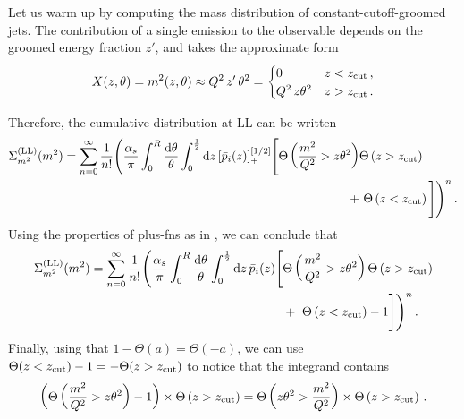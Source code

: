 \begin{example}
    \label{ex:constant-cutoff-mass}
    Let us warm up by computing the mass distribution of constant-cutoff-groomed jets.
    The contribution of a single emission to the observable depends on the groomed energy fraction \(z'\), and takes the approximate form
    \begin{align}
        X(z, \theta)
        =
        m^2(z,\theta)
        \approx
        Q^2 \, z'\,\theta^2
        =
        \begin{cases}
            0 & z < z_{\rm cut}\,,
            \\
            Q^2 \, z\theta^2 & z > z_{\rm cut}
            \,.
        \end{cases}
    \end{align}

    Therefore, the cumulative distribution at LL can be written
    \begin{equation}
    \begin{aligned}
        \label{eq:LL_mass}
        \Sigma^{\rm(LL)}_{m^2}(m^2)
        =
        \sum_{n = 0}^{\infty}\frac{1}{n!}
        \Bigg(
        \frac{\alpha_s}{\pi}
        \int_0^R \frac{\dd\theta}{\theta}
        \int_0^{\frac{1}{2}} \dd z\,[\bar{p}_i(z)]_+^{[1/2]}
        \Bigg[
            \Theta\left(
                \frac{m^2}{Q^2} > z\theta^2
            \right)
            &
            \Theta\left(z > \zcut\right)
            \\
            \notag
            +
            &\,\,\Theta\left(z < \zcut\right)
        \Bigg]
        \Bigg)^n
        \,.
    \end{aligned}
    \end{equation}
    Using the properties of \glspl{plus-fn} as in , we can conclude that
    \begin{equation}
    \begin{aligned}
        \Sigma^{\rm(LL)}_{m^2}(m^2)
        =
        \sum_{n = 0}^{\infty}\frac{1}{n!}
        \Bigg(
        \frac{\alpha_s}{\pi}
        \int_0^R \frac{\dd\theta}{\theta}
        \int_0^{\frac{1}{2}} \dd z\,\bar{p}_i(z)
        \Bigg[
            &\Theta\left(
                \frac{m^2}{Q^2} > z\theta^2
            \right)
            \Theta\left(z > z_{\rm cut}\right)
            \\
            \notag
            &+
            \,\,\Theta\left(z < z_{\rm cut}\right) - 1
        \Bigg]
        \Bigg)^n
        \,.
    \end{aligned}
    \end{equation}
    Finally, using that \(1 - \Theta(a) = \Theta(-a)\), we can use \(\Theta(z < z_{\rm cut}) - 1 = -\Theta(z > z_{\rm cut})\) to notice that the integrand contains
    \begin{align}
        \left(
        \Theta\left(
            \frac{m^2}{Q^2} > z\theta^2
        \right)
        - 1
        \right)
        \times
        \Theta\left(z > z_{\rm cut}\right)
        =
        \Theta\left(
            z\theta^2 > \frac{m^2}{Q^2}
        \right)
        \times
        \Theta\left(z > z_{\rm cut}\right)
        \,.
    \end{align}


\end{example}
